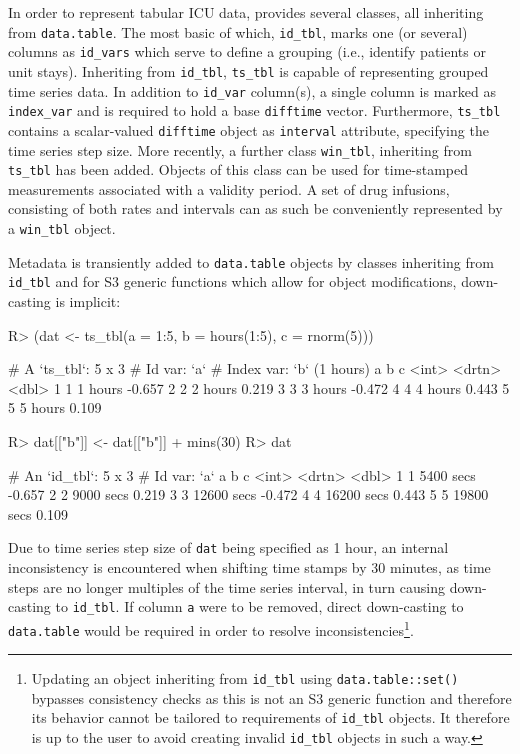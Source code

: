 \documentclass[
  notitle]{jss}
\begin{document}
In order to represent tabular ICU data,  provides several
classes, all inheriting from \texttt{data.table}. The most basic of
which, \texttt{id\_tbl}, marks one (or several) columns as
\texttt{id\_vars} which serve to define a grouping (i.e., identify
patients or unit stays). Inheriting from \texttt{id\_tbl},
\texttt{ts\_tbl} is capable of representing grouped time series data. In
addition to \texttt{id\_var} column(s), a single column is marked as
\texttt{index\_var} and is required to hold a base 
\texttt{difftime} vector. Furthermore, \texttt{ts\_tbl} contains a
scalar-valued \texttt{difftime} object as \texttt{interval} attribute,
specifying the time series step size. More recently, a further class
\texttt{win\_tbl}, inheriting from \texttt{ts\_tbl} has been added.
Objects of this class can be used for time-stamped measurements
associated with a validity period. A set of drug infusions, consisting
of both rates and intervals can as such be conveniently represented by a
\texttt{win\_tbl} object.

Metadata is transiently added to \texttt{data.table} objects by classes
inheriting from \texttt{id\_tbl} and for S3 generic functions which
allow for object modifications, down-casting is implicit:

\begin{CodeChunk}
\begin{CodeInput}
R> (dat <- ts_tbl(a = 1:5, b = hours(1:5), c = rnorm(5)))
\end{CodeInput}
\begin{CodeOutput}
# A `ts_tbl`: 5 x 3
# Id var:     `a`
# Index var:  `b` (1 hours)
      a b            c
  <int> <drtn>   <dbl>
1     1 1 hours -0.657
2     2 2 hours  0.219
3     3 3 hours -0.472
4     4 4 hours  0.443
5     5 5 hours  0.109
\end{CodeOutput}
\begin{CodeInput}
R> dat[["b"]] <- dat[["b"]] + mins(30)
R> dat
\end{CodeInput}
\begin{CodeOutput}
# An `id_tbl`: 5 x 3
# Id var:      `a`
      a b               c
  <int> <drtn>      <dbl>
1     1  5400 secs -0.657
2     2  9000 secs  0.219
3     3 12600 secs -0.472
4     4 16200 secs  0.443
5     5 19800 secs  0.109
\end{CodeOutput}
\end{CodeChunk}

Due to time series step size of \texttt{dat} being specified as 1 hour,
an internal inconsistency is encountered when shifting time stamps by 30
minutes, as time steps are no longer multiples of the time series
interval, in turn causing down-casting to \texttt{id\_tbl}. If column
\texttt{a} were to be removed, direct down-casting to
\texttt{data.table} would be required in order to resolve
inconsistencies\footnote{Updating an object inheriting from
  \texttt{id\_tbl} using \texttt{data.table::set()} bypasses consistency
  checks as this is not an S3 generic function and therefore its
  behavior cannot be tailored to requirements of \texttt{id\_tbl}
  objects. It therefore is up to the user to avoid creating invalid
  \texttt{id\_tbl} objects in such a way.}.
\end{document}
